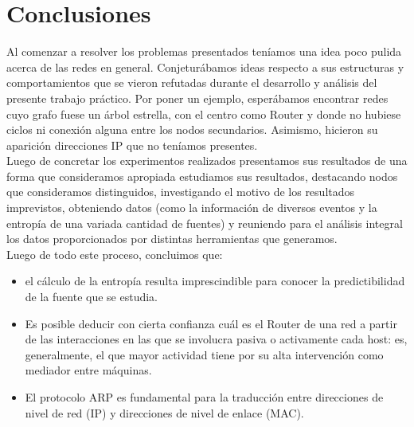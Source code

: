 





\section{Conclusiones}

Al comenzar a resolver los problemas presentados ten\'iamos una idea poco pulida acerca de las redes en general. Conjetur\'abamos ideas respecto a sus estructuras y comportamientos que se vieron refutadas durante el desarrollo y an\'alisis del presente trabajo pr\'actico. Por poner un ejemplo, esper\'abamos encontrar redes cuyo grafo fuese un \'arbol estrella, con el centro como Router y donde no hubiese ciclos ni conexi\'on alguna entre los nodos secundarios. Asimismo, hicieron su aparici\'on direcciones IP que no ten\'iamos presentes.\\
Luego de concretar los experimentos realizados presentamos sus resultados de una forma que consideramos apropiada estudiamos sus resultados, destacando nodos que consideramos distinguidos, investigando el motivo de los resultados imprevistos, obteniendo datos (como la informaci\'on de diversos eventos y la entrop\'ia de una variada cantidad de fuentes) y reuniendo para el an\'alisis integral los datos proporcionados por distintas herramientas que generamos.\\
Luego de todo este proceso, concluimos que:
\begin{itemize}
	\item el c\'alculo de la entrop\'ia resulta imprescindible para conocer la predictibilidad de la fuente que se estudia. 
	\item Es posible deducir con cierta confianza cu\'al es el Router de una red a partir de las interacciones en las que se involucra pasiva o activamente cada host: es, generalmente, el que mayor actividad tiene por su alta intervenci\'on como mediador entre m\'aquinas.
    \item El protocolo ARP es fundamental para la traducci\'on entre direcciones de nivel de red (IP) y direcciones de nivel de enlace (MAC).  
\end{itemize}
